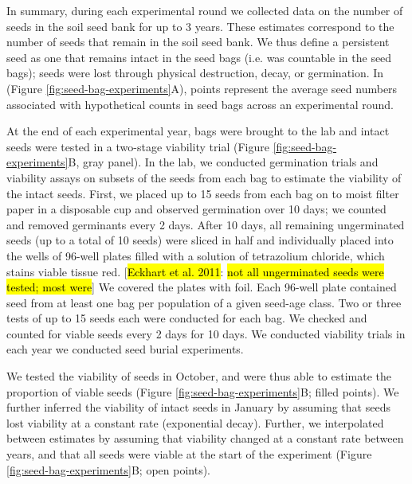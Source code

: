 \documentclass[12pt, oneside, titlepage]{article}   	%
\begin{document}
In summary, during each experimental round we collected data on the number of seeds in the soil seed bank for up to 3 years. These estimates correspond to the number of seeds that remain in the soil seed bank. We thus define a persistent seed as one that remains intact in the seed bags (i.e. was countable in the seed bags); seeds were lost through physical destruction, decay, or germination. In (Figure \ref{fig:seed-bag-experiments}A), points represent the average seed numbers associated with hypothetical counts in seed bags across an experimental round.

At the end of each experimental year, bags were brought to the lab and intact seeds were tested in a two-stage viability trial (Figure \ref{fig:seed-bag-experiments}B, gray panel). In the lab, we conducted germination trials and viability assays on subsets of the seeds from each bag to estimate the viability of the intact seeds. First, we placed up to 15 seeds from each bag on to moist filter paper in a disposable cup and observed germination over 10 days; we counted and removed germinants every 2 days.  After 10 days, all remaining ungerminated seeds (up to a total of 10 seeds) were sliced in half and individually placed into the wells of 96-well plates filled with a solution of tetrazolium chloride, which stains viable tissue red. [\hl{Eckhart et al. 2011}: \hl{not all ungerminated seeds were tested; most were}] We covered the plates with foil. Each 96-well plate contained seed from at least one bag per population of a given seed-age class. Two or three tests of up to 15 seeds each were conducted for each bag. We checked and counted for viable seeds every 2 days for 10 days. We conducted viability trials in each year we conducted seed burial experiments.

We tested the viability of seeds in October, and were thus able to estimate the proportion of viable seeds (Figure \ref{fig:seed-bag-experiments}B; filled points). We further inferred the viability of intact seeds in January by assuming that seeds lost viability at a constant rate (exponential decay). Further, we interpolated between estimates by assuming that viability changed at a constant rate between years, and that all seeds were viable at the start of the experiment (Figure \ref{fig:seed-bag-experiments}B; open points).
\end{document}
